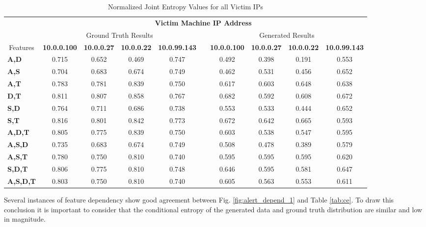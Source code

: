 \begin{table}[!htbp]
	\caption{Normalized Joint Entropy Values for all Victim IPs}
	\label{tab:je}
	\centering
	\begin{adjustbox}{angle=90}
		\begin{tabular}{l|c|c|c|c|c|c|c|c|c|}
			\multicolumn{1}{c|}{} & \multicolumn{9}{c|}{\textbf{Victim Machine IP Address}} \\
			\multicolumn{1}{c|}{} & \multicolumn{4}{c|}{Ground Truth Results} &  & \multicolumn{4}{c|}{Generated Results} \\
			\multicolumn{1}{c|}{Features} & \textbf{10.0.0.100} & \textbf{10.0.0.27} & \textbf{10.0.0.22} & \textbf{10.0.99.143} &  & \textbf{10.0.0.100} & \textbf{10.0.0.27} & \textbf{10.0.0.22} & \textbf{10.0.99.143} \\ \hline
			\textbf{A,D} & 0.715 & 0.652 & 0.469 & 0.747 &  & 0.492 & 0.398 & 0.191 & 0.553 \\
			\textbf{A,S} & 0.704 & 0.683 & 0.674 & 0.749 &  & 0.462 & 0.531 & 0.456 & 0.652 \\
			\textbf{A,T} & 0.783 & 0.781 & 0.839 & 0.750 &  & 0.617 & 0.603 & 0.648 & 0.638 \\
			\textbf{D,T} & 0.811 & 0.807 & 0.858 & 0.767 &  & 0.682 & 0.592 & 0.608 & 0.672 \\
			\textbf{S,D} & 0.764 & 0.711 & 0.686 & 0.738 &  & 0.553 & 0.533 & 0.444 & 0.652 \\
			\textbf{S,T} & 0.816 & 0.801 & 0.842 & 0.773 &  & 0.672 & 0.642 & 0.665 & 0.593 \\ \hline
			\textbf{A,D,T} & 0.805 & 0.775 & 0.839 & 0.750 &  & 0.603 & 0.538 & 0.547 & 0.595 \\
			\textbf{A,S,D} & 0.735 & 0.683 & 0.674 & 0.749 &  & 0.508 & 0.478 & 0.389 & 0.579 \\
			\textbf{A,S,T} & 0.780 & 0.750 & 0.810 & 0.740 &  & 0.595 & 0.595 & 0.595 & 0.620 \\
			\textbf{S,D,T} & 0.806 & 0.775 & 0.810 & 0.748 &  & 0.646 & 0.595 & 0.581 & 0.647 \\ \hline
			\textbf{A,S,D,T} & 0.803 & 0.750 & 0.810 & 0.740 &  & 0.605 & 0.563 & 0.553 & 0.611
			\end{tabular}
	\end{adjustbox}
\end{table}

Several instances of feature dependency show good agreement between Fig. \ref{fig:alert_depend_1} and Table \ref{tab:ce}. To draw this conclusion it is important to consider that the conditional entropy of the generated data and ground truth distribution are similar and low in magnitude.

